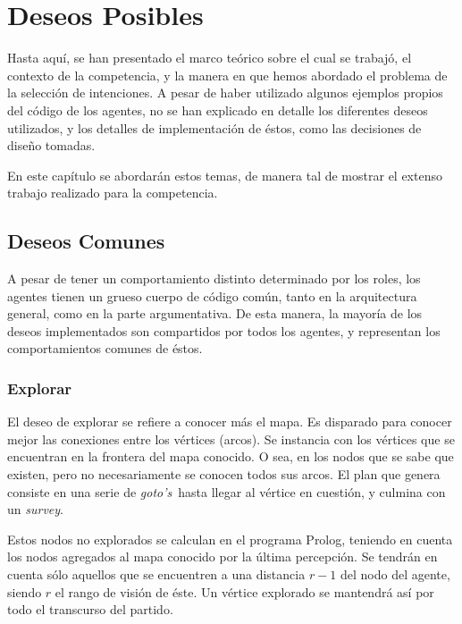 \documentclass[oneside]{book}
\begin{document}



\chapter{Deseos Posibles}

Hasta aquí, se han presentado el marco teórico sobre el cual se trabajó, el contexto
de la competencia, y la manera en que hemos abordado el problema de la selección de
intenciones. A pesar de haber utilizado algunos ejemplos propios del código de los 
agentes, no se han explicado en detalle los diferentes deseos utilizados, y los 
detalles de implementación de éstos, como las decisiones de diseño tomadas.

En este capítulo se abordarán estos temas, de manera tal de mostrar el extenso 
trabajo realizado para la competencia.

\section{Deseos Comunes}

A pesar de tener un comportamiento distinto determinado por los roles, los agentes
tienen un grueso cuerpo de código común, tanto en la arquitectura general, como 
en la parte argumentativa. De esta manera, la mayoría de los deseos implementados son
compartidos por todos los agentes, y representan los comportamientos comunes de éstos.

\subsection{Explorar}

El deseo de explorar se refiere a conocer más el mapa. Es disparado para 
conocer mejor las conexiones entre los vértices (arcos). Se instancia con los vértices
que se encuentran en la frontera del mapa conocido. O sea, en los nodos que se sabe
que existen, pero no necesariamente se conocen todos sus arcos. El plan que genera 
consiste en una serie de \textit{goto's}\ hasta llegar al vértice en cuestión, y 
culmina con un \textit{survey}.

Estos nodos no explorados se calculan en el programa Prolog, teniendo en cuenta los 
nodos agregados al mapa conocido por la última percepción. Se tendrán en cuenta sólo
aquellos que se encuentren a una distancia $r - 1$ del nodo del agente, siendo $r$
el rango de visión de éste. Un vértice explorado se mantendrá así por todo el 
transcurso del partido.
\end{document}
